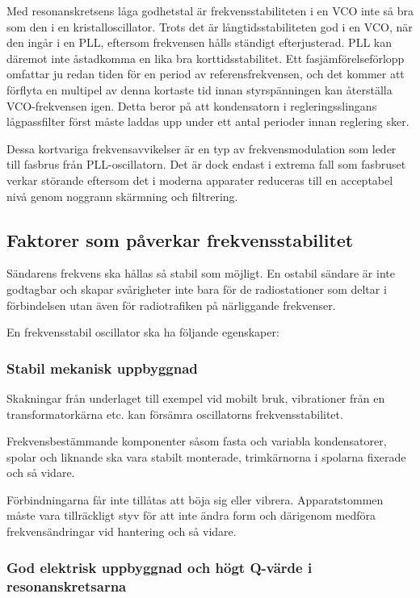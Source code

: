 Med resonanskretsens låga godhetstal är frekvensstabiliteten i en VCO inte så
bra som den i en kristalloscillator.
Trots det är långtidsstabiliteten god i en VCO, när den ingår i en PLL,
eftersom frekvensen hålls ständigt efterjusterad.
PLL kan däremot inte åstadkomma en lika bra korttidsstabilitet.
Ett fasjämförelseförlopp omfattar ju redan tiden för en period av
referensfrekvensen, och det kommer att förflyta en multipel av denna kortaste
tid innan styrspänningen kan återställa VCO-frekvensen igen.
Detta beror på att kondensatorn i regleringsslingans lågpassfilter först måste
laddas upp under ett antal perioder innan reglering sker.

Dessa kortvariga frekvensavvikelser är en typ av frekvensmodulation
som leder till fasbrus från PLL-oscillatorn.
Det är dock endast i extrema fall som fasbruset verkar störande eftersom det
i moderna apparater reduceras till en acceptabel nivå genom noggrann
skärmning och filtrering.

\subsection{Faktorer som påverkar frekvensstabilitet}

Sändarens frekvens ska hållas så stabil som möjligt.
En ostabil sändare är inte godtagbar och skapar svårigheter inte bara för de
radiostationer som deltar i förbindelsen utan även för radiotrafiken
på närliggande frekvenser.

En frekvensstabil oscillator ska ha följande egenskaper:

\subsubsection{Stabil mekanisk uppbyggnad}

Skakningar från underlaget till exempel vid mobilt bruk, vibrationer från en
transformatorkärna etc. kan försämra oscillatorns frekvensstabilitet.

Frekvensbestämmande komponenter såsom fasta och variabla kondensatorer, spolar
och liknande ska vara stabilt monterade, trimkärnorna i spolarna fixerade och
så vidare.

Förbindningarna får inte tillåtas att böja sig eller vibrera.
Apparatstommen måste vara tillräckligt styv för att inte ändra form och
därigenom medföra frekvensändringar vid hantering och så vidare.

\subsubsection{God elektrisk uppbyggnad och högt Q-värde i resonanskretsarna}

